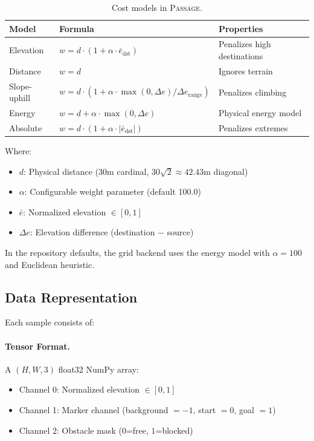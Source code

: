\documentclass{article}
\newcommand{\dataset}{\textsc{Passage}}
\begin{document}
\begin{table}[h]
\centering
\caption{Cost models in \dataset{}.}
\label{tab:costmodels}
\small
\begin{tabular}{lll}
\toprule
Model & Formula & Properties \\
\midrule
Elevation & $w = d \cdot (1 + \alpha \cdot \bar{e}_{\text{dst}})$ & Penalizes high destinations \\
Distance & $w = d$ & Ignores terrain \\
Slope-uphill & $w = d \cdot (1 + \alpha \cdot \max(0, \Delta e) / \Delta e_{\text{range}})$ & Penalizes climbing \\
Energy & $w = d + \alpha \cdot \max(0, \Delta e)$ & Physical energy model \\
Absolute & $w = d \cdot (1 + \alpha \cdot |\bar{e}_{\text{dst}}|)$ & Penalizes extremes \\
\bottomrule
\end{tabular}
\end{table}

Where:
\begin{itemize}[noitemsep]
    \item $d$: Physical distance (30m cardinal, $30\sqrt{2} \approx 42.43$m diagonal)
    \item $\alpha$: Configurable weight parameter (default 100.0)
    \item $\bar{e}$: Normalized elevation $\in [0, 1]$
    \item $\Delta e$: Elevation difference (destination $-$ source)
\end{itemize}

In the repository defaults, the grid backend uses the energy model with $\alpha=100$ and Euclidean heuristic.

\subsection{Data Representation}

Each sample consists of:

\paragraph{Tensor Format.} A $(H, W, 3)$ float32 NumPy array:
\begin{itemize}[noitemsep]
    \item Channel 0: Normalized elevation $\in [0, 1]$
    \item Channel 1: Marker channel (background $=-1$, start $=0$, goal $=1$)
    \item Channel 2: Obstacle mask ($0$=free, $1$=blocked)
\end{itemize}
\end{document}
